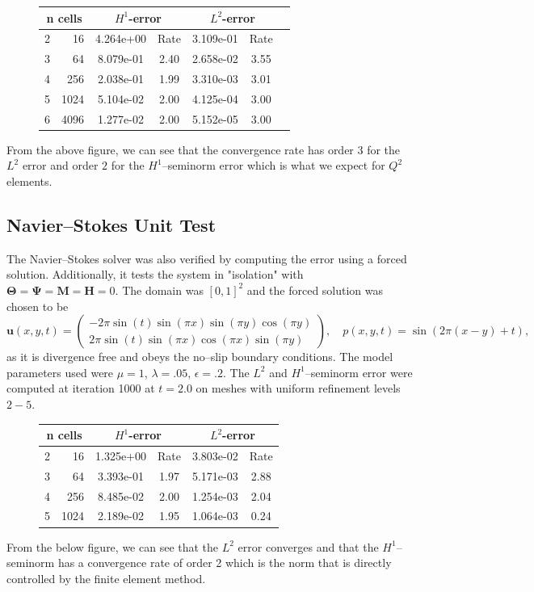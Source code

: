 \documentclass[11pt,fullpage]{article}
\newcommand{\eps}{\epsilon}
\theoremstyle{lemma}
\theoremstyle{definition}
\theoremstyle{lemma}
\begin{document}
\begin{figure}[!ht]
	\centering
	\begin{tabular}{|c|r|c|c|c|c|c|} \hline
		\multicolumn{2}{|c|}{n cells} & 
		\multicolumn{2}{|c|}{$H^1$-error} & 
		\multicolumn{2}{|c|}{$L^2$-error}\\ \hline
		2 & 16 & 4.264e+00 & Rate & 3.109e-01 &  Rate\\ \hline
		3 & 64 & 8.079e-01 &  2.40 & 2.658e-02 &  3.55\\ \hline
		4 & 256 & 2.038e-01 &  1.99 & 3.310e-03 &  3.01\\ \hline
		5 & 1024 & 5.104e-02 &  2.00 & 4.125e-04 &  3.00\\ \hline
		6 & 4096 & 1.277e-02 &  2.00 & 5.152e-05 &  3.00\\ \hline
	\end{tabular}
\end{figure}
\noindent From the above figure, we can see that the convergence rate has order 3 for the $L^2$ error and order $2$ for the $H^1$--seminorm error which is what we expect for $Q^2$ elements.

\subsection{Navier--Stokes Unit Test}
The Navier--Stokes solver was also verified by computing the error using a forced solution. Additionally, it tests the system in "isolation" with $\mathbf{\Theta} = \mathbf{\Psi} = \mathbf{M} = \mathbf{H} = 0$. The domain was $[0,1]^2$ and the forced solution was chosen to be
$$
\mathbf{u}(x,y,t) = \begin{pmatrix}
-2\pi\sin(t)\sin(\pi x)\sin(\pi y)\cos(\pi y)\\
2\pi\sin(t)\sin(\pi x)\cos(\pi x)\sin(\pi y)
\end{pmatrix}, \quad p(x,y,t) = \sin(2\pi(x - y) + t),
$$
as it is divergence free and obeys the no--slip boundary conditions. The model parameters used were $\mu = 1$, $\lambda = .05$, $\eps = .2$. The $L^2$ and $H^1$--seminorm error were computed at iteration 1000 at $t=2.0$ on meshes with uniform refinement levels $2-5$.
\begin{figure}[!ht]
	\centering
	\begin{tabular}{|c|r|c|c|c|c|} \hline
		\multicolumn{2}{|c|}{n cells} & 
		\multicolumn{2}{|c|}{$H^1$-error} & 
		\multicolumn{2}{|c|}{$L^2$-error}\\ \hline
		2 & 16 & 1.325e+00 &  Rate & 3.803e-02 & Rate\\ \hline
		3 & 64 & 3.393e-01 &  1.97 & 5.171e-03 & 2.88\\ \hline
		4 & 256 & 8.485e-02 &  2.00 & 1.254e-03 & 2.04\\ \hline
		5 & 1024 & 2.189e-02 &  1.95 & 1.064e-03 & 0.24\\ \hline
	\end{tabular}
\end{figure}
From the below figure, we can see that the $L^2$ error converges and that the $H^1$--seminorm has a convergence rate of order 2 which is the norm that is directly controlled by the finite element method.
\end{document}

